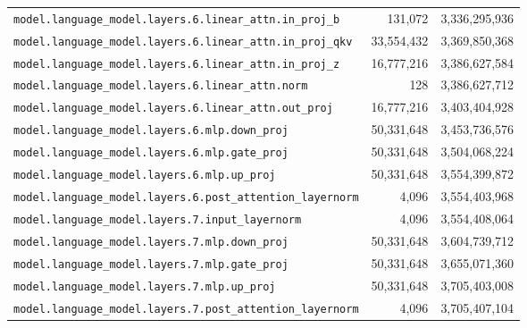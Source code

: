\documentclass[10pt,a4paper]{article}
\theoremstyle{definition}
\begin{document}
\begin{appendices}
\begin{longtable}{p{9.5cm}rr}
\texttt{model.\allowbreak{}language\_model.\allowbreak{}layers.\allowbreak{}6.\allowbreak{}linear\_attn.\allowbreak{}in\_proj\_b} & 131,072 & 3,336,295,936 \\
\texttt{model.\allowbreak{}language\_model.\allowbreak{}layers.\allowbreak{}6.\allowbreak{}linear\_attn.\allowbreak{}in\_proj\_qkv} & 33,554,432 & 3,369,850,368 \\
\texttt{model.\allowbreak{}language\_model.\allowbreak{}layers.\allowbreak{}6.\allowbreak{}linear\_attn.\allowbreak{}in\_proj\_z} & 16,777,216 & 3,386,627,584 \\
\texttt{model.\allowbreak{}language\_model.\allowbreak{}layers.\allowbreak{}6.\allowbreak{}linear\_attn.\allowbreak{}norm} & 128 & 3,386,627,712 \\
\texttt{model.\allowbreak{}language\_model.\allowbreak{}layers.\allowbreak{}6.\allowbreak{}linear\_attn.\allowbreak{}out\_proj} & 16,777,216 & 3,403,404,928 \\
\texttt{model.\allowbreak{}language\_model.\allowbreak{}layers.\allowbreak{}6.\allowbreak{}mlp.\allowbreak{}down\_proj} & 50,331,648 & 3,453,736,576 \\
\texttt{model.\allowbreak{}language\_model.\allowbreak{}layers.\allowbreak{}6.\allowbreak{}mlp.\allowbreak{}gate\_proj} & 50,331,648 & 3,504,068,224 \\
\texttt{model.\allowbreak{}language\_model.\allowbreak{}layers.\allowbreak{}6.\allowbreak{}mlp.\allowbreak{}up\_proj} & 50,331,648 & 3,554,399,872 \\
\texttt{model.\allowbreak{}language\_model.\allowbreak{}layers.\allowbreak{}6.\allowbreak{}post\_attention\_layernorm} & 4,096 & 3,554,403,968 \\
\texttt{model.\allowbreak{}language\_model.\allowbreak{}layers.\allowbreak{}7.\allowbreak{}input\_layernorm} & 4,096 & 3,554,408,064 \\
\texttt{model.\allowbreak{}language\_model.\allowbreak{}layers.\allowbreak{}7.\allowbreak{}mlp.\allowbreak{}down\_proj} & 50,331,648 & 3,604,739,712 \\
\texttt{model.\allowbreak{}language\_model.\allowbreak{}layers.\allowbreak{}7.\allowbreak{}mlp.\allowbreak{}gate\_proj} & 50,331,648 & 3,655,071,360 \\
\texttt{model.\allowbreak{}language\_model.\allowbreak{}layers.\allowbreak{}7.\allowbreak{}mlp.\allowbreak{}up\_proj} & 50,331,648 & 3,705,403,008 \\
\texttt{model.\allowbreak{}language\_model.\allowbreak{}layers.\allowbreak{}7.\allowbreak{}post\_attention\_layernorm} & 4,096 & 3,705,407,104 \\

\end{longtable}
\end{appendices}
\end{document}
